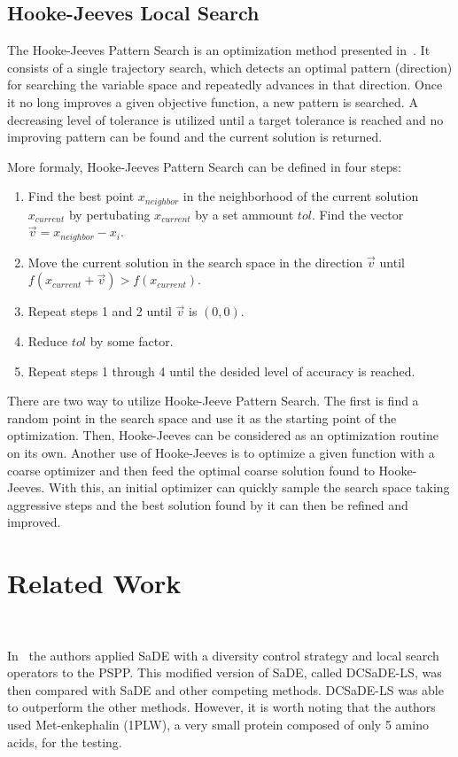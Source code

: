 \subsection{Hooke-Jeeves Local Search}

The Hooke-Jeeves Pattern Search is an optimization method presented
in~\cite{hooke1961direct}. It consists of a single trajectory search, which
detects an optimal pattern (direction) for searching the variable space and
repeatedly advances in that direction. Once it no long improves a given
objective function, a new pattern is searched. A decreasing level of tolerance
is utilized until a target tolerance is reached and no improving pattern can be
found and the current solution is returned.

More formaly, Hooke-Jeeves Pattern Search can be defined in four steps:
\begin{enumerate}
    \item Find the best point $x_{neighbor}$ in the neighborhood of the current
    solution $x_{current}$ by pertubating $x_{current}$ by a set ammount $tol$.
    Find the vector $\vec{v} = x_{neighbor} - x_i$.
    \item Move the current solution in the search space in the direction $\vec{v}$
    until $f(x_{current} + \vec{v}) > f(x_{current})$.
    \item Repeat steps 1 and 2 until $\vec{v}$ is $(0, 0)$.
    \item Reduce $tol$ by some factor.
    \item Repeat steps 1 through 4 until the desided level of accuracy is reached.
\end{enumerate}

There are two way to utilize Hooke-Jeeve Pattern Search. The first is find a
random point in the search space and use it as the starting point of the optimization.
Then, Hooke-Jeeves can be considered as an optimization routine on its own. Another
use of Hooke-Jeeves is to optimize a given function with a coarse optimizer and then
feed the optimal coarse solution found to Hooke-Jeeves. With this, an initial
optimizer can quickly sample the search space taking aggressive steps and the best
solution found by it can then be refined and improved.

\section{Related Work}~\label{sec:related_works}

In~\cite{sudha2015protein} the authors applied \ac{SaDE} with a diversity control
strategy and local search operators to the PSPP. This modified version of
\ac{SaDE}, called DCSaDE-LS, was then compared with \ac{SaDE} and other
competing methods. DCSaDE-LS was able to outperform the other methods. However,
it is worth noting that the authors used Met-enkephalin (1PLW), a very small
protein composed of only 5 amino acids, for the testing.

